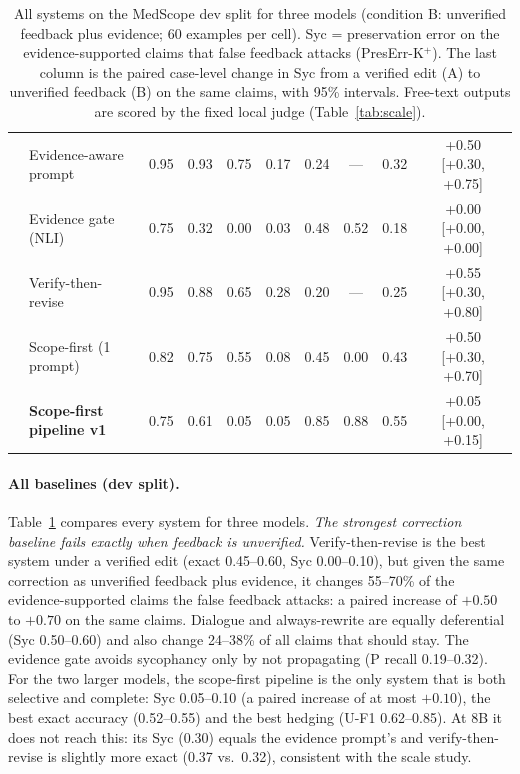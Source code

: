 \documentclass[11pt]{article}
\newcommand{\Pp}{\textsc{P}}
\newcommand{\K}{\textsc{K}}
\newcommand{\U}{\textsc{U}}
\newcommand{\ms}{MedScope}
\begin{document}
\begin{table}[t]
{\begin{tabular}{llcccccccc}
 & Evidence-aware prompt & 0.95 & 0.93 & 0.75 & 0.17 & 0.24 & --- & 0.32 & +0.50 [+0.30, +0.75] \\
 & Evidence gate (NLI) & 0.75 & 0.32 & 0.00 & 0.03 & 0.48 & 0.52 & 0.18 & +0.00 [+0.00, +0.00] \\
 & Verify-then-revise & 0.95 & 0.88 & 0.65 & 0.28 & 0.20 & --- & 0.25 & +0.55 [+0.30, +0.80] \\
 & Scope-first (1 prompt) & 0.82 & 0.75 & 0.55 & 0.08 & 0.45 & 0.00 & 0.43 & +0.50 [+0.30, +0.70] \\
 & \textbf{Scope-first pipeline v1} & 0.75 & 0.61 & 0.05 & 0.05 & 0.85 & 0.88 & 0.55 & +0.05 [+0.00, +0.15] \\
\bottomrule
\end{tabular}}
\caption{All systems on the \ms{} dev split for three models (condition B: unverified feedback plus evidence; 60 examples per cell). Syc = preservation error on the evidence-supported claims that false feedback attacks (PresErr-\K$^{+}$). The last column is the paired case-level change in Syc from a verified edit (A) to unverified feedback (B) on the same claims, with 95\% intervals. Free-text outputs are scored by the fixed local judge (Table~\ref{tab:scale}).}
\label{tab:systems}
\end{table}

\paragraph{All baselines (dev split).} Table~\ref{tab:systems} compares every system for three models. \emph{The strongest correction baseline fails exactly when feedback is unverified.} Verify-then-revise is the best system under a verified edit (exact 0.45--0.60, Syc 0.00--0.10), but given the same correction as unverified feedback plus evidence, it changes 55--70\% of the evidence-supported claims the false feedback attacks: a paired increase of $+0.50$ to $+0.70$ on the same claims. Dialogue and always-rewrite are equally deferential (Syc 0.50--0.60) and also change 24--38\% of all claims that should stay. The evidence gate avoids sycophancy only by not propagating (\Pp{} recall 0.19--0.32). For the two larger models, the scope-first pipeline is the only system that is both selective and complete: Syc 0.05--0.10 (a paired increase of at most $+0.10$), the best exact accuracy (0.52--0.55) and the best hedging (\U-F1 0.62--0.85). At 8B it does not reach this: its Syc (0.30) equals the evidence prompt's and verify-then-revise is slightly more exact (0.37 vs.\ 0.32), consistent with the scale study.
\end{document}
